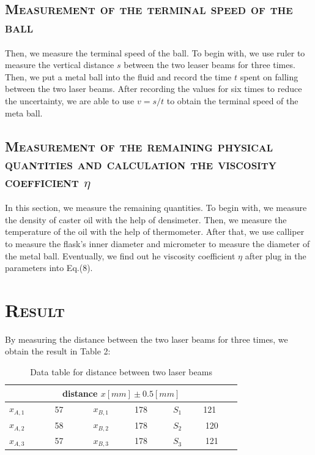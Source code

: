 \documentclass[a4paper,12pt]{article}
\begin{document}
\subsection{\textsc{Measurement of the terminal speed of the ball}}
Then, we measure the terminal speed of the ball. To begin with, we use ruler to measure the vertical distance $s$ between the two leaser beams for three times. Then, we put a metal ball into the fluid and record the time $t$ spent on falling between the two laser beams. After recording the values for six times to reduce the uncertainty, we are able to use $v = s/t$ to obtain the terminal speed of the meta ball.
\subsection{\textsc{Measurement of the remaining physical quantities and calculation the viscosity coefficient $\eta$}}
In this section, we measure the remaining quantities. To begin with, we measure the density of caster oil with the help of densimeter. Then, we measure the temperature of the oil with the help of thermometer. After that, we use calliper to measure the flask's inner diameter and micrometer to measure the diameter of the metal ball. Eventually, we find out he viscosity coefficient $\eta$ after plug in the parameters into Eq.(8).


\section{\textsc{Result}}
By measuring the distance between the two laser beams for three times, we obtain the result in Table 2:

\begin{table}[h]
\begin{center}
\begin{tabular}{|c|c|c|c|c|c|}
\hline
\multicolumn{6}{|c|}{distance $x [mm] \pm 0.5 [mm]$} \\
\hline
$x_{A,1}$ & ~~~~~57~~~~~ & $x_{B,1}$ & ~~~~178~~~~ & $S_1$ &~~~121~~~~\\
$x_{A,2}$ & 58 & $x_{B,2}$ & 178 & $S_2$ & 120\\
$x_{A,3}$ & 57 & $x_{B,3}$ & 178 & $S_3$ & 121\\
\hline
\end{tabular}
\caption{Data table for distance between two laser beams}
\end{center}
\end{table}
\end{document}
